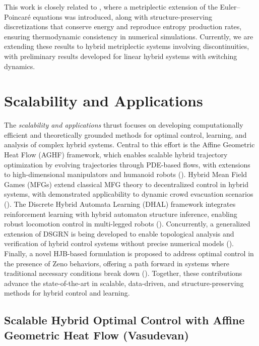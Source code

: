 \documentclass[letterpaper,11pt]{article}
\begin{document}
This work is closely related to \cite{teng2024generalized}, where a metriplectic extension of the Euler–Poincaré equations was introduced, along with structure-preserving discretizations that conserve energy and reproduce entropy production rates, ensuring thermodynamic consistency in numerical simulations.
Currently, we are extending these results to hybrid metriplectic systems involving discontinuities, with preliminary results developed for linear hybrid systems with switching dynamics.

\section{Scalability and Applications}\label{sec:SA}

The \textit{scalability and applications} thrust focuses on developing computationally efficient and theoretically grounded methods for optimal control, learning, and analysis of complex hybrid systems. 
Central to this effort is the Affine Geometric Heat Flow (AGHF) framework, which enables scalable hybrid trajectory optimization by evolving trajectories through PDE-based flows, with extensions to high-dimensional manipulators and humanoid robots (). 
Hybrid Mean Field Games (MFGs) extend classical MFG theory to decentralized control in hybrid systems, with demonstrated applicability to dynamic crowd evacuation scenarios (). 
The Discrete Hybrid Automata Learning (DHAL) framework integrates reinforcement learning with hybrid automaton structure inference, enabling robust locomotion control in multi-legged robots (). 
Concurrently, a generalized extension of DSGRN is being developed to enable topological analysis and verification of hybrid control systems without precise numerical models (). 
Finally, a novel HJB-based formulation is proposed to address optimal control in the presence of Zeno behaviors, offering a path forward in systems where traditional necessary conditions break down (). 
Together, these contributions advance the state-of-the-art in scalable, data-driven, and structure-preserving methods for hybrid control and learning.

\subsection{Scalable Hybrid Optimal Control with Affine Geometric Heat Flow (Vasudevan)}\label{sec:affine_geometric_flow}
\end{document}
